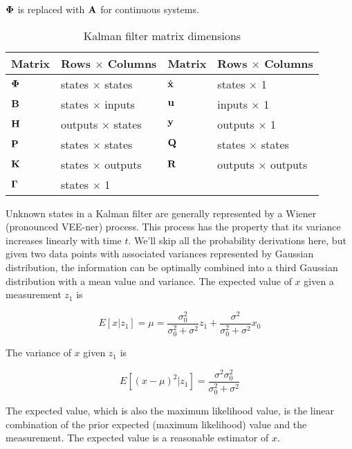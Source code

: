 $\mathbf{\Phi}$ is replaced with $\mathbf{A}$ for continuous systems.

\begin{table}[ht]
  \renewcommand{\arraystretch}{1.5}
  \centering
  \begin{tabular}{|ll|ll|}
    \hline
    \rowcolor{headingbg}
    \textbf{Matrix} & \textbf{Rows $\times$ Columns} &
    \textbf{Matrix} & \textbf{Rows $\times$ Columns} \\
    \hline
    $\mathbf{\Phi}$ & states $\times$ states & $\hat{\mathbf{x}}$ & states $\times$ 1
      \\
    $\mathbf{B}$ & states $\times$ inputs & $\mathbf{u}$ & inputs $\times$ 1 \\
    $\mathbf{H}$ & outputs $\times$ states & $\mathbf{y}$ & outputs $\times$ 1 \\
    $\mathbf{P}$ & states $\times$ states & $\mathbf{Q}$ & states $\times$ states \\
    $\mathbf{K}$ & states $\times$ outputs & $\mathbf{R}$ & outputs $\times$ outputs
      \\
    $\mathbf{\Gamma}$ & states $\times$ 1 &  &  \\
    \hline
  \end{tabular}
  \caption{Kalman filter matrix dimensions}
  \label{tab:kf_matrix_dims}
\end{table}

Unknown states in a Kalman filter are generally represented by a Wiener
(pronounced VEE-ner) process. This process has the property that its variance
increases linearly with time $t$. We'll skip all the probability derivations
here, but given two data points with associated variances represented by
Gaussian distribution, the information can be optimally combined into a third
Gaussian distribution with a mean value and variance. The expected value of $x$
given a measurement $z_1$ is

\begin{equation}
  E[x|z_1] = \mu = \frac{\sigma_0^2}{\sigma_0^2 + \sigma^2}z_1 +
    \frac{\sigma^2}{\sigma_0^2 + \sigma^2}x_0
\end{equation}

The variance of $x$ given $z_1$ is

\begin{equation}
  E[(x - \mu)^2|z_1] = \frac{\sigma^2 \sigma_0^2}{\sigma_0^2 + \sigma^2}
\end{equation}

The expected value, which is also the maximum likelihood value, is the linear
combination of the prior expected (maximum likelihood) value and the
measurement. The expected value is a reasonable estimator of $x$.

